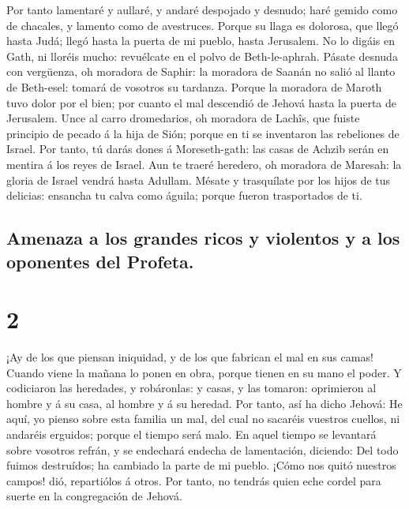  Por tanto lamentaré y aullaré, y andaré despojado y
desnudo; haré gemido como de chacales, y lamento como de avestruces.
 Porque su llaga es dolorosa, que llegó hasta Judá; llegó
hasta la puerta de mi pueblo, hasta Jerusalem.  No lo
digáis en Gath, ni lloréis mucho: revuélcate en el polvo de
Beth-le-aphrah.  Pásate desnuda con vergüenza, oh moradora
de Saphir: la moradora de Saanán no salió al llanto de Beth-esel: tomará
de vosotros su tardanza.  Porque la moradora de Maroth tuvo
dolor por el bien; por cuanto el mal descendió de Jehová hasta la puerta
de Jerusalem.  Unce al carro dromedarios, oh moradora de
Lachîs, que fuiste principio de pecado á la hija de Sión; porque en ti
se inventaron las rebeliones de Israel.  Por tanto, tú
darás dones á Moreseth-gath: las casas de Achzib serán en mentira á los
reyes de Israel.  Aun te traeré heredero, oh moradora de
Maresah: la gloria de Israel vendrá hasta Adullam.  Mésate
y trasquílate por los hijos de tus delicias: ensancha tu calva como
águila; porque fueron trasportados de ti.

\hypertarget{amenaza-a-los-grandes-ricos-y-violentos-y-a-los-oponentes-del-profeta.}{%
\subsection{Amenaza a los grandes ricos y violentos y a los oponentes
del
Profeta.}\label{amenaza-a-los-grandes-ricos-y-violentos-y-a-los-oponentes-del-profeta.}}

\hypertarget{section-1}{%
\section{2}\label{section-1}}

 ¡Ay de los que piensan iniquidad, y de los que fabrican el
mal en sus camas! Cuando viene la mañana lo ponen en obra, porque tienen
en su mano el poder.  Y codiciaron las heredades, y
robáronlas: y casas, y las tomaron: oprimieron al hombre y á su casa, al
hombre y á su heredad.  Por tanto, así ha dicho Jehová: He
aquí, yo pienso sobre esta familia un mal, del cual no sacaréis vuestros
cuellos, ni andaréis erguidos; porque el tiempo será malo. 
En aquel tiempo se levantará sobre vosotros refrán, y se endechará
endecha de lamentación, diciendo: Del todo fuimos destruídos; ha
cambiado la parte de mi pueblo. ¡Cómo nos quitó nuestros campos! dió,
repartiólos á otros.  Por tanto, no tendrás quien eche
cordel para suerte en la congregación de Jehová.

